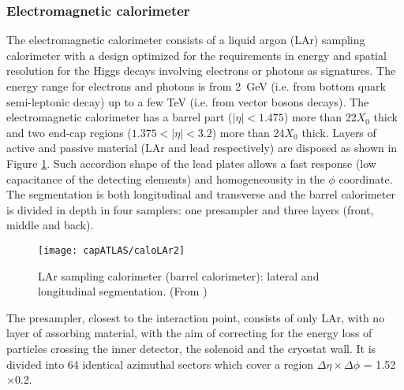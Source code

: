 
\subsubsection{Electromagnetic calorimeter}
The electromagnetic calorimeter consists of a liquid argon (LAr) sampling calorimeter with a design optimized for the requirements in energy and spatial resolution for the Higgs decays involving electrons or photons as signatures. The energy range for electrons and photons is from 2~GeV (i.e. from bottom quark semi-leptonic decay) up to a few TeV (i.e. from vector bosons decays). 
The electromagnetic calorimeter has a barrel part ($|\eta| < 1.475$) more than 22$X_{0}$ thick and two end-cap regions ($1.375 < |\eta| < 3.2$) more than 24$X_{0}$ thick. Layers of active and passive material (LAr and lead respectively) are disposed as shown in Figure \ref{caloLAr2}. 
Such accordion shape of the lead plates allows a fast response (low capacitance of the detecting elements) and homogeneousity in the $\phi$ coordinate. The segmentation is both longitudinal and transverse and the barrel calorimeter is divided in depth in four samplers: one presampler and three layers (front, middle and back). 

\begin{figure}[htb]\begin{center}
\texttt{[image: capATLAS/caloLAr2]}\caption{LAr sampling calorimeter (barrel calorimeter): lateral and longitudinal segmentation. (From \cite{Aad:JINST})}\label{caloLAr2}
\end{center}\end{figure}

The presampler, closest to the interaction point, consists of only LAr, with no layer of assorbing material, with the aim of correcting for the energy loss of particles crossing the inner detector, the solenoid and the cryostat wall. It is divided into 64 identical azimuthal sectors which cover a region $\Delta\eta\times\Delta\phi$ = 1.52$\times$0.2.

